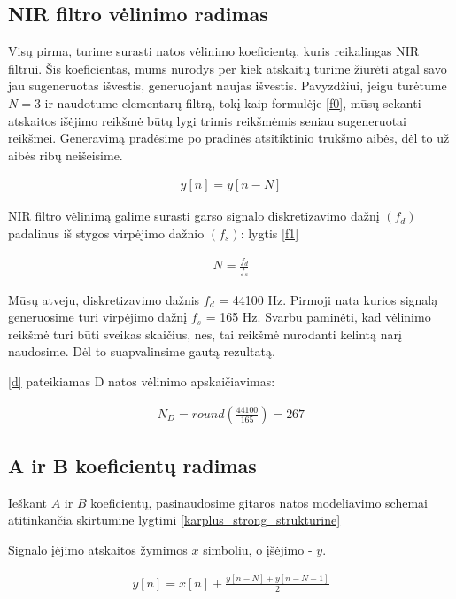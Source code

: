 \documentclass[10pt,a4paper,twocolumn]{article}
\begin{document}
\subsection*{NIR filtro vėlinimo radimas}

Visų pirma, turime surasti natos vėlinimo koeficientą, kuris reikalingas NIR filtrui. Šis koeficientas, mums nurodys per kiek atskaitų turime žiūrėti atgal savo jau sugeneruotas išvestis, generuojant naujas išvestis. Pavyzdžiui, jeigu turėtume $N = 3$ ir naudotume elementarų filtrą, tokį kaip formulėje \ref{f0}, mūsų sekanti atskaitos išėjimo reikšmė būtų lygi trimis reikšmėmis seniau sugeneruotai reikšmei. Generavimą pradėsime po pradinės atsitiktinio trukšmo aibės, dėl to už aibės ribų neišeisime.

\begin{eqnarray}
y[n] = y[n-N]
\label{f0}
\end{eqnarray}

NIR filtro vėlinimą galime surasti garso signalo diskretizavimo dažnį $(f_d)$ padalinus iš stygos virpėjimo dažnio $(f_s)$: lygtis \ref{f1}

\begin{eqnarray}
N = \frac{f_d}{f_s}
\label{f1}
\end{eqnarray}

Mūsų atveju, diskretizavimo dažnis $f_d$ = 44100 Hz. Pirmoji nata kurios signalą generuosime turi virpėjimo dažnį $f_s$ = 165 Hz. Svarbu paminėti, kad vėlinimo reikšmė turi būti sveikas skaičius, nes, tai reikšmė nurodanti kelintą narį naudosime. Dėl to suapvalinsime gautą rezultatą.

\ref{d} pateikiamas D natos vėlinimo apskaičiavimas:


\begin{eqnarray}
N_D = round(\frac{44100}{165}) = 267
\label{d}
\end{eqnarray}



\subsection*{A ir B koeficientų radimas}


Ieškant $A$ ir $B$ koeficientų, pasinaudosime gitaros natos modeliavimo schemai atitinkančia skirtumine lygtimi \ref{karplus_strong_strukturine}

Signalo įėjimo atskaitos žymimos $x$ simboliu, o įšėjimo - $y$. 

\begin{eqnarray}
y[n] = x[n] + \frac{y[n-N] + y[n-N-1]}{2}
\label{karplus_strong_strukturine}
\end{eqnarray}
\end{document}
